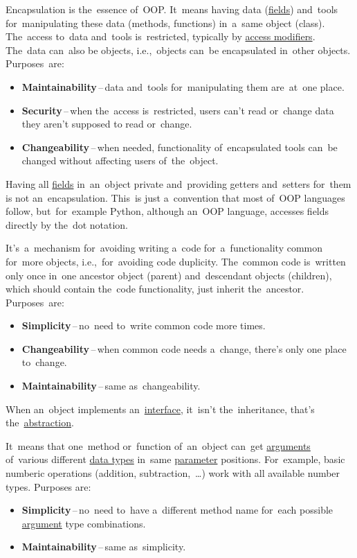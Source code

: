 \label{encapsulation}
Encapsulation is the~essence of~OOP. It~means having data (\hyperref[variablefieldproperty]{fields}) and~tools for~manipulating these data (methods, functions) in~a~same object (class). The~access to~data and~tools is~restricted, typically by \hyperref[javaaccessmodifiers]{access modifiers}. The~data can~also be objects, i.e.,~objects can~be encapsulated in~other objects. Purposes~are:
\begin{itemize}
    \item \textbf{Maintainability}\,--\,data and~tools for~manipulating them are~at~one place.
    \item \textbf{Security}\,--\,when the~access is~restricted, users can't read or~change data they aren't supposed to read or~change.
    \item \textbf{Changeability}\,--\,when needed, functionality of~encapsulated tools can~be changed without affecting users of~the~object.
\end{itemize}

\warning Having all \hyperref[variablefieldproperty]{fields} in~an~object private and~providing getters and~setters for~them is not an~encapsulation. This~is just a~convention that most of~OOP languages follow, but~for~example Python, although an~OOP language, accesses fields directly by the~dot notation.

\label{inheritance}
It's~a~mechanism for~avoiding writing a~code for~a~functionality common for~more objects, i.e.,~for~avoiding code duplicity. The~common code is~written only once in~one ancestor object (parent) and~descendant objects (children), which should contain the~code functionality, just inherit the~ancestor. Purposes~are:
\begin{itemize}
    \item \textbf{Simplicity}\,--\,no~need to~write common code more times.
    \item \textbf{Changeability}\,--\,when common code needs a~change, there's only one place to~change.
    \item \textbf{Maintainability}\,--\,same as~changeability.
\end{itemize}

\warning When an~object implements an~\hyperref[javainterface]{interface}, it~isn't the~inheritance, that's the~\hyperref[abstraction]{abstraction}.

It~means that one~method or~function of~an~object can~get \hyperref[parameterargument]{arguments} of~various different \hyperref[datatypes]{data types} in~same \hyperref[parameterargument]{parameter} positions. For~example, basic numberic operations (addition, subtraction,~\dots) work with all available number types. Purposes are:
\begin{itemize}
    \item \textbf{Simplicity}\,--\,no~need to~have a~different method name for~each possible \hyperref[parameterargument]{argument} type combinations.
    \item \textbf{Maintainability}\,--\,same as~simplicity.
\end{itemize}

